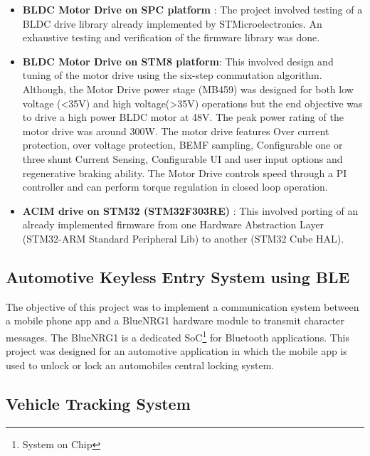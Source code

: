 \documentclass[]{book}
\begin{document}
\begin{itemize}
\item
  \textbf{BLDC Motor Drive on SPC platform} : The project involved
  testing of a BLDC drive library already implemented by
  STMicroelectronics. An exhaustive testing and verification of the
  firmware library was done.
\item
  \textbf{BLDC Motor Drive on STM8 platform}: This involved design and
  tuning of the motor drive using the six-step commutation algorithm.
  Although, the Motor Drive power stage (MB459) was designed for both
  low voltage (\textless{}35V) and high voltage(\textgreater{}35V)
  operations but the end objective was to drive a high power BLDC motor
  at 48V. The peak power rating of the motor drive was around 300W. The
  motor drive features Over current protection, over voltage protection,
  BEMF sampling, Configurable one or three shunt Current Sensing,
  Configurable UI and user input options and regenerative braking
  ability. The Motor Drive controls speed through a PI controller and
  can perform torque regulation in closed loop operation.
\item
  \textbf{ACIM drive on STM32 (STM32F303RE)} : This involved porting of
  an already implemented firmware from one Hardware Abstraction Layer
  (STM32-ARM Standard Peripheral Lib) to another (STM32 Cube HAL).
\end{itemize}

\subsection{Automotive Keyless Entry System using
BLE}\label{automotive-keyless-entry-system-using-ble}

The objective of this project was to implement a communication system
between a mobile phone app and a BlueNRG1 hardware module to transmit
character messages. The BlueNRG1 is a dedicated SoC\footnote{System on Chip}
for Bluetooth applications. This project was designed for an automotive
application in which the mobile app is used to unlock or lock an
automobiles central locking system.

\subsection{Vehicle Tracking System}\label{vehicle-tracking-system}
\end{document}
